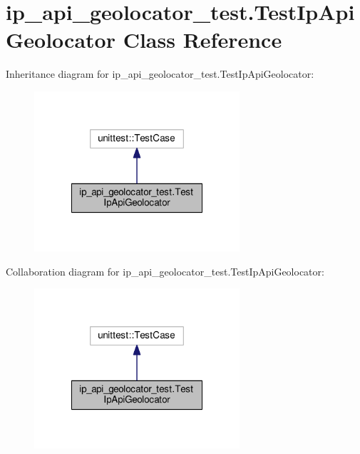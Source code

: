 \hypertarget{classip__api__geolocator__test_1_1TestIpApiGeolocator}{\section{ip\-\_\-api\-\_\-geolocator\-\_\-test.\-Test\-Ip\-Api\-Geolocator Class Reference}
\label{classip__api__geolocator__test_1_1TestIpApiGeolocator}
}


Inheritance diagram for ip\-\_\-api\-\_\-geolocator\-\_\-test.\-Test\-Ip\-Api\-Geolocator\-:
\nopagebreak
\begin{figure}[H]
\begin{center}
\leavevmode
\includegraphics[width=216pt]{classip__api__geolocator__test_1_1TestIpApiGeolocator__inherit__graph}
\end{center}
\end{figure}


Collaboration diagram for ip\-\_\-api\-\_\-geolocator\-\_\-test.\-Test\-Ip\-Api\-Geolocator\-:
\nopagebreak
\begin{figure}[H]
\begin{center}
\leavevmode
\includegraphics[width=216pt]{classip__api__geolocator__test_1_1TestIpApiGeolocator__coll__graph}
\end{center}
\end{figure}
